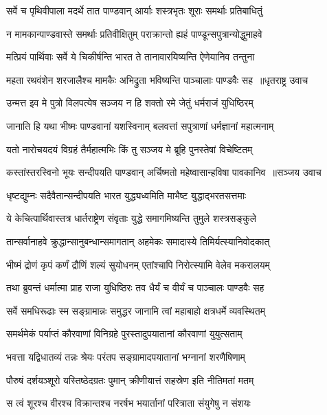 \twolineshloka
{सर्वे च पृथिवीपाला मदर्थे तात पाण्डवान्}
{आर्याः शस्त्रभृतः शूराः समर्थाः प्रतिबाधितुं}


\twolineshloka
{न मामकान्पाण्डवास्ते समर्थाः प्रतिवीक्षितुम्}
{पराक्रान्तो ह्यहं पाण्डून्सपुत्रान्योद्धुमाहवे}


\twolineshloka
{मत्प्रियं पार्थिवाः सर्वे ये चिकीर्षन्ति भारत}
{ते तानावारयिष्यन्ति ऐणेयानिव तन्तुना}


\threelineshloka
{महता रथवंशेन शरजालैश्च मामकैः}
{अभिद्रुता भविष्यन्ति पाञ्चालाः पाण्डवैः सह ॥धृतराष्ट्र उवाच}
{}


\twolineshloka
{उन्मत्त इव मे पुत्रो विलपत्येष सञ्जय}
{न हि शक्तो रमे जेतुं धर्मराजं युधिष्ठिरम्}


\twolineshloka
{जानाति हि यथा भीष्मः पाण्डवानां यशस्विनाम्}
{बलवत्तां सपुत्राणां धर्मज्ञानां महात्मनाम्}


\twolineshloka
{यतो नारोचयदयं विग्रहं तैर्महात्मभिः}
{किं तु सञ्जय मे ब्रूहि पुनस्तेषां विचेष्टितम्}


\threelineshloka
{कस्तांस्तरस्विनो भूयः सन्दीपयति पाण्डवान्}
{अर्चिष्मतो महेष्वासान्हविषा पावकानिव ॥सञ्जय उवाच}
{}


\twolineshloka
{धृष्टद्युम्नः सदैवैतान्सन्दीपयति भारत}
{युद्ध्यध्वमिति माभैष्ट युद्धाद्भरतसत्तमाः}


\twolineshloka
{ये केचित्पार्थिवास्तत्र धार्तराष्ट्रेण संवृताः}
{युद्धे समागमिष्यन्ति तुमुले शस्त्रसङ्कुले}


\twolineshloka
{तान्सर्वानाहवे क्रुद्धान्सानुबन्धान्समागतान्}
{अहमेकः समादास्ये तिमिर्यत्स्यानिवोदकात्}


\twolineshloka
{भीष्मं द्रोणं कृपं कर्णं द्रौणिं शल्यं सुयोधनम्}
{एतांश्चापि निरोत्स्यामि वेलेव मकरालयम्}


\twolineshloka
{तथा ब्रुवन्तं धर्मात्मा प्राह राजा युधिष्ठिरः}
{तव धैर्यं च वीर्यं च पाञ्चालः पाण्डवैः सह}


\twolineshloka
{सर्वे समधिरूढाः स्म सङ्ग्रामान्नः समुद्धर}
{जानामि त्वां महाबाहो क्षत्रधर्मे व्यवस्थितम्}


\twolineshloka
{समर्थमेकं पर्याप्तं कौरवाणां विनिग्रहे}
{पुरस्तादुपयातानां कौरवाणां युयुत्सताम्}


\twolineshloka
{भवत्ता यद्विधातव्यं तन्नः श्रेयः परंतप}
{सङ्ग्रामादपयातानां भग्नानां शरणैषिणाम्}


\twolineshloka
{पौरुषं दर्शयञ्शूरो यस्तिष्ठेदग्रतः पुमान्}
{क्रीणीयात्तं सहस्रेण इति नीतिमतां मतम्}


\twolineshloka
{स त्वं शूरश्च वीरश्च विक्रान्तश्च नरर्षभ}
{भयार्तानां परित्राता संयुगेषु न संशयः}


